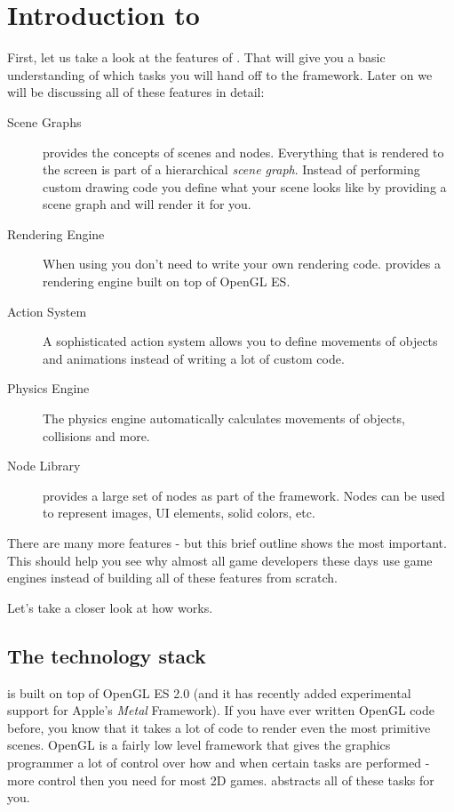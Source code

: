 \section{Introduction to \cocos{}}
First, let us take a look at the features of \cocos{}. That will give you a
basic understanding of which tasks you will hand off to the framework. Later on
we will be discussing all of these features in detail:
\begin{description}
  \item[Scene Graphs] \cocos{} provides the concepts of scenes and nodes.
  Everything that is rendered to the screen is part of a hierarchical
  \textit{scene graph}. Instead of performing custom drawing code you define
  what your scene looks like by providing a scene graph and \cocos{} will render
  it for you.
  \item[Rendering Engine] When using \cocos{} you don't need to write your own
  rendering code. \cocos{} provides a rendering engine built on top of OpenGL
  ES.
  \item[Action System] A sophisticated action system allows you to define
  movements of objects and animations instead of writing a lot of custom code.
  \item[Physics Engine] The \cocos{} physics engine automatically
  calculates movements of objects, collisions and more.
  \item[Node Library] \cocos{} provides a large set of nodes as part of the
  framework. Nodes can be used to represent images, UI elements, solid colors,
  etc.
\end{description}

There are many more features - but this brief outline shows the most
important. This should help you see why almost all game developers these
days use game engines instead of building all of these features from scratch.
 
Let's take a closer look at how \cocos{} works.

\subsection{The \cocos{} technology stack}

\cocos{} is built on top of OpenGL ES 2.0 (and it has recently added
experimental support for Apple's \textit{Metal} Framework).
If you have ever written OpenGL code before, you know that it takes a lot of
code to render even the most primitive scenes.	OpenGL is a fairly low level
framework that gives the graphics programmer a lot of control over how and when certain tasks are performed -
more control then you need for most 2D games. \cocos{} abstracts all of these
tasks for you. 


